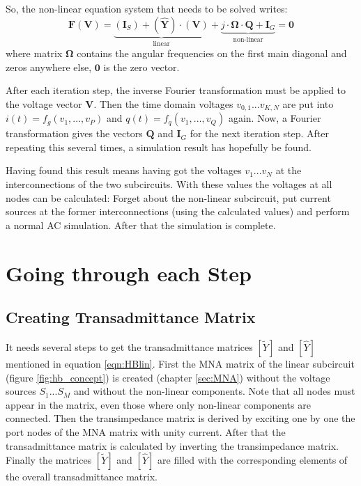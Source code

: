 \addvspace{12pt}

So, the non-linear equation system that needs to be solved writes:
\begin{equation}
\label{eqn:HBeqn}
\textbf{F}(\textbf{V})
  = \underbrace{(\boldsymbol{I}_S) + (\boldsymbol{\hat{Y}})\cdot (\boldsymbol{V})}_{\text{linear}}
  + \underbrace{j\cdot \boldsymbol{\Omega}\cdot \boldsymbol{Q} + \boldsymbol{I}_G}_{\text{non-linear}}
  = \boldsymbol{0}
\end{equation}
where matrix $\boldsymbol{\Omega}$ contains the angular frequencies
on the first main diagonal and zeros anywhere else, $\boldsymbol{0}$
is the zero vector.

\addvspace{12pt}

After each iteration step, the inverse Fourier transformation must
be applied to the voltage vector $\boldsymbol{V}$. Then the time domain
voltages $v_{0,1}...v_{K,N}$ are put into $i(t) = f_g(v_1, ..., v_P)$
and $q(t) = f_q(v_1, ..., v_Q)$ again. Now, a Fourier transformation
gives the vectors $\boldsymbol{Q}$ and $\boldsymbol{I}_G$ for the
next iteration step. After repeating this several times, a simulation
result has hopefully be found.

\addvspace{12pt}

Having found this result means having got the voltages $v_1...v_N$ at
the interconnections of the two subcircuits. With these values the
voltages at all nodes can be calculated: Forget about the non-linear
subcircuit, put current sources at the former interconnections (using
the calculated values) and perform a normal AC simulation. After that
the simulation is complete.

\section{Going through each Step}

\subsection{Creating Transadmittance Matrix}

It needs several steps to get the transadmittance matrices $[\tilde{Y}]$
and $[\hat{Y}]$ mentioned in equation \eqref{eqn:HBlin}. First the MNA
matrix of the linear subcircuit (figure \ref{fig:hb_concept}) is created
(chapter \ref{sec:MNA}) without the voltage sources $S_1$...$S_M$ and
without the non-linear components. Note that all nodes must appear in the
matrix, even those where only non-linear components are connected. Then
the transimpedance matrix is derived by
exciting one by one the port nodes of the MNA matrix with unity current.
After that the transadmittance matrix is calculated by inverting the
transimpedance matrix. Finally the matrices $[\tilde{Y}]$ and $[\hat{Y}]$
are filled with the corresponding elements of the overall transadmittance
matrix.

